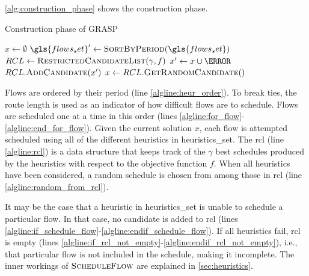 \autoref{alg:construction_phase} shows the construction phase.
\begin{algorithm}[t] \label{alg:construction_phase}
\small
\caption{Construction phase of GRASP} \label{alg:construction_phase}
   \begin{algorithmic}[1]
         \State $x \gets \emptyset$
         \State $\gls{flows_set}' \gets \Call{SortByPeriod}{\gls{flows_set}}$ \label{algline:heur_order}
          \label{algline:for_flow}
            \State $RCL \gets \Call{RestrictedCandidateList}{\gamma, f}$ \label{algline:rcl}
                \label{algline:if_schedule_flow}
                  \State $x' \gets x \cup \s$
                  \State $RCL.\Call{AddCandidate}{x'}$
               \EndIf \label{algline:endif_schedule_flow}
            \EndFor
             \label{algline:if_rcl_not_empty}
               \State $x \gets RCL.\Call{GetRandomCandidate}$ \label{algline:random_from_rcl}
            \EndIf \label{algline:endif_rcl_not_empty}
         \EndFor \label{algline:end_for_flow}
         \State {}
      \EndFunction
   \end{algorithmic}
\end{algorithm}
Flows are ordered by their period (line \ref{algline:heur_order}). To break ties, the route length is used as an indicator of how difficult flows are to schedule. Flows are scheduled one at a time in this order (lines \ref{algline:for_flow}-\ref{algline:end_for_flow}). Given the current solution $x$, each flow is attempted scheduled using all of the different heuristics in \gls{heuristics_set}. The \gls{rcl} (line \ref{algline:rcl}) is a data structure that keeps track of the $\gamma$ best schedules produced by the heuristics with respect to the objective function $f$. When all heuristics have been considered, a random schedule is chosen from among those in \gls{rcl} (line \ref{algline:random_from_rcl}).

It may be the case that a heuristic in \gls{heuristics_set} is unable to schedule a particular flow. In that case, no candidate is added to \gls{rcl} (lines \ref{algline:if_schedule_flow}-\ref{algline:endif_schedule_flow}). If all heuristics fail, \gls{rcl} is empty (lines \ref{algline:if_rcl_not_empty}-\ref{algline:endif_rcl_not_empty}), i.e., that particular flow is not included in the schedule, making it incomplete. The inner workings of $\Call{ScheduleFlow}{}$ are explained in \autoref{sec:heuristics}.

